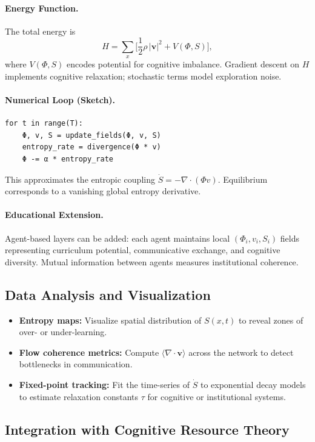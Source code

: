 \documentclass[12pt,a4paper]{article}
\begin{document}
\paragraph{Energy Function.}
The total energy is
\[
H = \sum_x \bigg[\frac{1}{2}\rho\,|\mathbf{v}|^2 + V(\Phi,S)\bigg],
\]
where $V(\Phi,S)$ encodes potential for cognitive imbalance.  
Gradient descent on $H$ implements cognitive relaxation; stochastic terms model exploration noise.

\paragraph{Numerical Loop (Sketch).}
\begin{verbatim}
for t in range(T):
    Φ, v, S = update_fields(Φ, v, S)
    entropy_rate = divergence(Φ * v)
    Φ -= α * entropy_rate
\end{verbatim}
This approximates the entropic coupling $\dot S = -∇·(Φv)$.
Equilibrium corresponds to a vanishing global entropy derivative.

\paragraph{Educational Extension.}
Agent-based layers can be added: each agent maintains local $(Φ_i, v_i, S_i)$ fields representing
curriculum potential, communicative exchange, and cognitive diversity.
Mutual information between agents measures institutional coherence.

\subsection{Data Analysis and Visualization}

\begin{itemize}[leftmargin=1.2em]
  \item \textbf{Entropy maps:} Visualize spatial distribution of $S(x,t)$ to reveal zones of over- or under-learning.
  \item \textbf{Flow coherence metrics:} Compute $\langle\nabla\!\cdot\mathbf{v}\rangle$ across the network to detect bottlenecks in communication.
  \item \textbf{Fixed-point tracking:} Fit the time-series of $\dot S$ to exponential decay models to estimate relaxation constants $\tau$ for cognitive or institutional systems.
\end{itemize}

\subsection{Integration with Cognitive Resource Theory}
\end{document}
